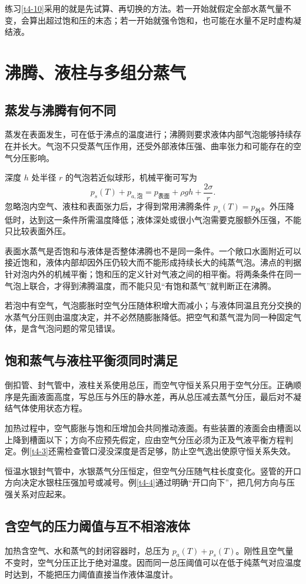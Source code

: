 练习\ref{t4-10}采用的就是先试算、再切换的方法。若一开始就假定全部水蒸气量不变，会算出超过饱和压的末态；若一开始就强令饱和，也可能在水量不足时虚构凝结液。

\section{沸腾、液柱与多组分蒸气}
\subsection{蒸发与沸腾有何不同}
蒸发在表面发生，可在低于沸点的温度进行；沸腾则要求液体内部气泡能够持续存在并长大。气泡不只受蒸气压作用，还受外部液体压强、曲率张力和可能存在的空气分压影响。

深度 $h$ 处半径 $r$ 的气泡若近似球形，机械平衡可写为
\[p_s(T)+p_{a,\text{泡}}=p_{\text{表面}}+\rho gh+\frac{2\sigma}{r}.
\]
忽略泡内空气、液柱和表面张力后，才得到常用沸腾条件 $p_s(T)=p_{\text{外}}$。外压降低时，达到这一条件所需温度降低；液体深处或很小气泡需要克服额外压强，不能只比较表面外压。

表面水蒸气是否饱和与液体是否整体沸腾也不是同一条件。一个敞口水面附近可以接近饱和，液体内部却因外压仍较大而不能形成持续长大的纯蒸气泡。沸点的判据针对泡内外的机械平衡；饱和压的定义针对气液之间的相平衡。将两条条件在同一气泡上联合，才得到沸腾温度，而不能只见“有饱和蒸气”就判断正在沸腾。

若泡中有空气，气泡膨胀时空气分压随体积增大而减小；与液体同温且充分交换的水蒸气分压则由温度决定，并不必然随膨胀降低。把空气和蒸气混为同一种固定气体，是含气泡问题的常见错误。




\subsection{饱和蒸气与液柱平衡须同时满足}
倒扣管、封气管中，液柱关系使用总压，而空气守恒关系只用于空气分压。正确顺序是先画液面高度，写总压与外压的静水差，再从总压减去蒸气分压，最后对不凝结气体使用状态方程。

加热过程中，空气膨胀与饱和压增加会共同推动液面。有些装置的液面会由槽面以上降到槽面以下；方向不应预先假定，应由空气分压必须为正及气液平衡方程判定。例\ref{t4-3}还需检查管口浸没深度是否足够，防止空气逸出使原守恒关系失效。

恒温水银封气管中，水银蒸气分压恒定，但空气分压随气柱长度变化。竖管的开口方向决定水银柱压强加号或减号。例\ref{t4-4}通过明确“开口向下”，把几何方向与压强关系对应起来。

\subsection{含空气的压力阈值与互不相溶液体}
加热含空气、水和蒸气的封闭容器时，总压为 $p_a(T)+p_s(T)$。刚性且空气量不变时，空气分压正比于绝对温度。因而同一总压阈值可以在低于纯蒸气对应温度时达到，不能把压力阈值直接当作液体温度计。

